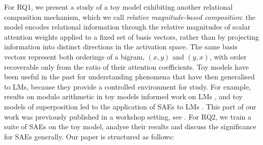For RQ1, we present a study of a toy model exhibiting another relational composition mechanism, which we call \emph{relative magnitude-based composition}: the model encodes relational information through the relative magnitudes of scalar attention weights applied to a fixed set of basis vectors, rather than by projecting information into distinct directions in the activation space. The same basis vectors represent both orderings of a bigram, $(x,y)$ and $(y,x)$, with order recoverable only from the ratio of their attention coefficients.
Toy models have been useful in the past for understanding phenomena that have then generalised to LMs, because they provide a controlled environment for study. For example, results on modulo arithmetic in toy models \citep{nanda2023progress} informed work on LMs \citep{baeumel2025modular}, and toy models of superposition \citep{elhage2022toy} led to the application of SAEs to LMs \citep{bricken2023monosemanticity}.
This part of our work was previously published in a workshop setting, see \cite{farrell2025order}.
For RQ2, we train a suite of SAEs on the toy model, analyse their results and discuss the significance for SAEs generally.
Our paper is structured as follows:
